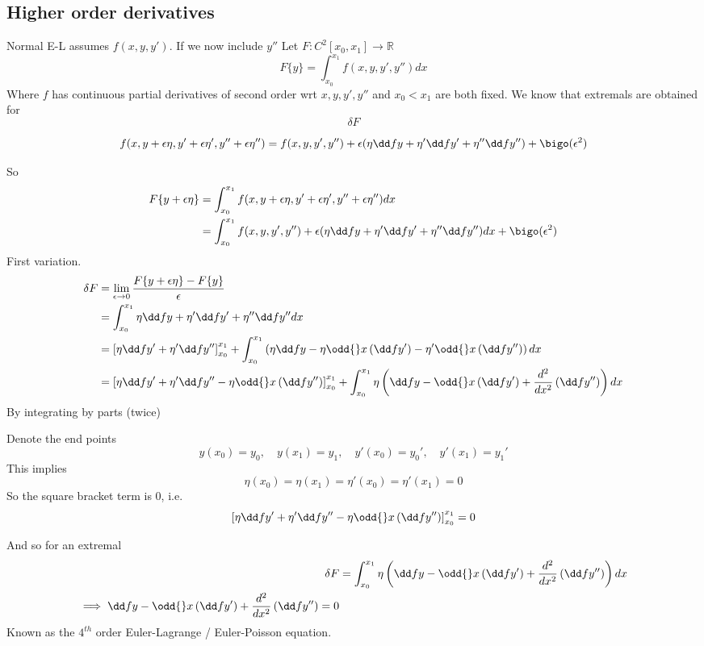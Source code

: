\documentclass{X:/Documents/Coding/Latex/myassignment}
\begin{document}
\subsection{Higher order derivatives}
Normal E-L assumes $f(x,y,y')$. If we now include $y''$
Let $F : C^2[x_0,x_1] \to \mathbb{R}$
\[F\{y\} = \int_{x_0}^{x_1} f(x,y,y',y'')dx\]
Where $f$ has continuous partial derivatives of second order wrt $x,y,y',y''$ and $x_0<x_1$ are both fixed.
We know that extremals are obtained for
\[\delta F \]

\begin{align*}
	f(x,y+\epsilon \eta, y' + \epsilon \eta', y'' + \epsilon \eta '' ) &= f(x,y,y',y'') + \epsilon(\eta \dd fy + \eta' \dd f{y'} + \eta'' \dd f{y''}) + \bigo( \epsilon^2)\\
\end{align*}

So
\begin{align*}
	F\{y + \epsilon \eta\} &= \int_{x_0}^{x_1} f(x,y+\epsilon \eta, y' + \epsilon \eta', y'' + \epsilon \eta '' ) dx\\
	&=\int_{x_0}^{x_1}  f(x,y,y',y'') + \epsilon(\eta \dd fy + \eta' \dd f{y'} + \eta'' \dd f{y''})dx + \bigo( \epsilon^2)
\end{align*}
First variation.
\begin{align*}
	\delta F &= \lim_{\epsilon \to 0} \frac{F\{y + \epsilon \eta\} - F\{y\}}{\epsilon}\\
	&=\int_{x_0}^{x_1} \eta \dd fy + \eta ' \dd f{y'} + \eta '' \dd f{y''} dx\\
	&= \left[\eta \dd f{y'} + \eta' \dd f {y''}\right]_{x_0}^{x_1} + \int_{x_0}^{x_1} \left(\eta \dd fy - \eta \odd{}x \left(\dd f{y'}\right) - \eta' \odd{}x \left(\dd f{y''}\right)\right) dx\\
	&= \left[\eta \dd f{y'} + \eta' \dd f {y''} - \eta\odd{}x\left(\dd f{y''}\right)\right]_{x_0}^{x_1} + \int_{x_0}^{x_1} \eta\left(\dd fy - \odd{}x \left(\dd f{y'}\right) + \frac{d^2}{dx^2} \left(\dd f{y''}\right)\right) dx\\
\end{align*}
By integrating by parts (twice)

Denote the end points
\[y(x_0) = y_0, \quad y(x_1) = y_1, \quad y'(x_0) = y_0', \quad y'(x_1) = y_1'\]
This implies 
\[\eta(x_0) = \eta(x_1) = \eta'(x_0) = \eta'(x_1) = 0\]
So the square bracket term is $0$, i.e.
\[\left[\eta \dd f{y'} + \eta' \dd f {y''} - \eta\odd{}x\left(\dd f{y''}\right)\right]_{x_0}^{x_1}  = 0\]

And so for an extremal
\begin{align*}
	\delta F &= \int_{x_0}^{x_1} \eta\left(\dd fy - \odd{}x \left(\dd f{y'}\right) + \frac{d^2}{dx^2} \left(\dd f{y''}\right)\right) dx \\
	\implies \dd fy - \odd{}x \left(\dd f{y'}\right) + \frac{d^2}{dx^2} \left(\dd f{y''}\right) = 0
\end{align*}
Known as the $4^{th}$ order Euler-Lagrange / Euler-Poisson equation. 
\end{document}
